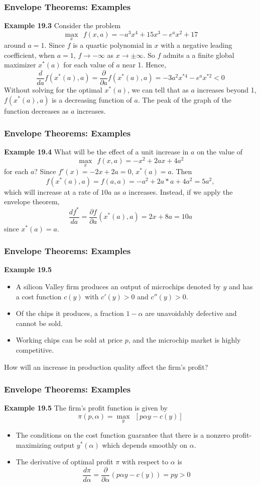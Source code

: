 \documentclass[9pt,aspectratio=169]{beamer}
\begin{document}
\begin{frame}
	\frametitle{Envelope Theorems: Examples}
	\textbf{Example 19.3} Consider the problem 
	$$\max_x\ \ f(x,a) = -a^3x^4+15x^3-e^ax^2+17$$
	around $a = 1$. Since $f$ is a quartic polynomial in $x$ with a negative
    leading coefficient, when $a = 1$, $f\rightarrow -\infty$ as
    $x\rightarrow \pm \infty$. So $f$ admits a a finite global maximizer
    $x^*(a)$ for each value of $a$ near 1. Hence,
    $$\frac{d}{da}f(x^*(a),a) = \frac{\partial}{\partial a}f(x^*(a),a) =
    -3a^2x^{*4}-e^ax^{*2}<0$$ Without solving for the optimal $x^*(a)$, we
    can tell that as $a$ increases beyond 1, $f(x^*(a),a)$ is a decreasing
    function of $a$. The peak of the graph of the function decreases as $a$
    increases.
	
\end{frame}


\begin{frame}
	\frametitle{Envelope Theorems: Examples} \textbf{Example 19.4} What will
    be the effect of a unit increase in $a$ on the value of
    $$\max_x\ \ f(x,a) = -x^2+2ax+4a^2$$ for each $a$? Since $f'(x) = -2x+2a
    = 0$, $x^*(a) = a$. Then
    $$f(x^*(a),a) = f(a,a) = -a^2+2a*a+4a^2 = 5a^2,$$
    which will increase at a rate of $10a$ as $a$ increases. Instead, if we
    apply the envelope theorem,
    $$\frac{df^*}{da} = \frac{\partial f}{\partial a}(x^*(a),a) = 2x+8a =
    10a$$ since $x^*(a) = a$.
\end{frame}

\begin{frame}
	\frametitle{Envelope Theorems: Examples}
	\textbf{Example 19.5}
	\begin{itemize}
		\item A silicon Valley firm produces an output of microchips denoted
        by $y$ and has a cost function $c(y)$ with $c'(y)>0$ and $c''(y)>0$.
		\item Of the chips it produces, a fraction $1-\alpha$ are unavoidably defective and cannot be sold. 
		\item Working chips can be sold at price $p$, and
		the microchip market is highly competitive.
	\end{itemize}
	How will an increase in production quality affect the firm’s profit?
\end{frame}


\begin{frame}
	\frametitle{Envelope Theorems: Examples} \textbf{Example 19.5} The firm’s
    profit function is given by
    $$\pi(p,\alpha) = \max_y\ \ [p\alpha y-c(y)]$$\vspace{-1em}
	\begin{itemize}
		\item The conditions on the cost function guarantee that there is a
        nonzero profit-maximizing output $y^*(\alpha)$ which depends smoothly
        on $\alpha$.
		\item The derivative of optimal profit $\pi$ with respect to $\alpha$ is 
		$$\frac{d\pi}{d\alpha} = \frac{\partial}{\partial \alpha}(p\alpha y-c(y))
        = py >0$$ 
	\end{itemize}
\end{frame}
\end{document}
